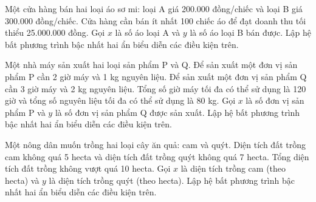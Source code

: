 \begin{ex}
Một cửa hàng bán hai loại áo sơ mi: loại A giá 200.000 đồng/chiếc và loại B giá 300.000 đồng/chiếc. Cửa hàng cần bán ít nhất 100 chiếc áo để đạt doanh thu tối thiểu 25.000.000 đồng. Gọi $x$ là số áo loại A và $y$ là số áo loại B bán được. Lập hệ bất phương trình bậc nhất hai ẩn biểu diễn các điều kiện trên.
\end{ex}

\begin{ex}
Một nhà máy sản xuất hai loại sản phẩm P và Q. Để sản xuất một đơn vị sản phẩm P cần 2 giờ máy và 1 kg nguyên liệu. Để sản xuất một đơn vị sản phẩm Q cần 3 giờ máy và 2 kg nguyên liệu. Tổng số giờ máy tối đa có thể sử dụng là 120 giờ và tổng số nguyên liệu tối đa có thể sử dụng là 80 kg. Gọi $x$ là số đơn vị sản phẩm P và $y$ là số đơn vị sản phẩm Q được sản xuất. Lập hệ bất phương trình bậc nhất hai ẩn biểu diễn các điều kiện trên.
\end{ex}

\begin{ex}
Một nông dân muốn trồng hai loại cây ăn quả: cam và quýt. Diện tích đất trồng cam không quá 5 hecta và diện tích đất trồng quýt không quá 7 hecta. Tổng diện tích đất trồng không vượt quá 10 hecta. Gọi $x$ là diện tích trồng cam (theo hecta) và $y$ là diện tích trồng quýt (theo hecta). Lập hệ bất phương trình bậc nhất hai ẩn biểu diễn các điều kiện trên.
\end{ex}

